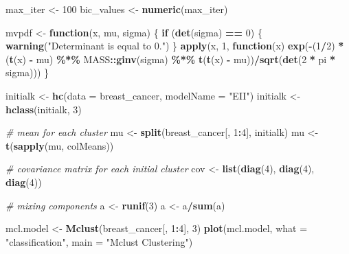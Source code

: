 \documentclass[12pt]{article}
\newenvironment{Shaded}{\begin{snugshade}}{\end{snugshade}}
\newcommand{\AttributeTok}[1]{\textcolor[rgb]{0.13,0.29,0.53}{#1}}
\newcommand{\CommentTok}[1]{\textcolor[rgb]{0.56,0.35,0.01}{\textit{#1}}}
\newcommand{\ControlFlowTok}[1]{\textcolor[rgb]{0.13,0.29,0.53}{\textbf{#1}}}
\newcommand{\DecValTok}[1]{\textcolor[rgb]{0.00,0.00,0.81}{#1}}
\newcommand{\FunctionTok}[1]{\textcolor[rgb]{0.13,0.29,0.53}{\textbf{#1}}}
\newcommand{\NormalTok}[1]{#1}
\newcommand{\OtherTok}[1]{\textcolor[rgb]{0.56,0.35,0.01}{#1}}
\newcommand{\SpecialCharTok}[1]{\textcolor[rgb]{0.81,0.36,0.00}{\textbf{#1}}}
\newcommand{\StringTok}[1]{\textcolor[rgb]{0.31,0.60,0.02}{#1}}
\begin{document}
\begin{Shaded}
\begin{Highlighting}[]
\NormalTok{max\_iter }\OtherTok{\textless{}{-}} \DecValTok{100}
\NormalTok{bic\_values }\OtherTok{\textless{}{-}} \FunctionTok{numeric}\NormalTok{(max\_iter)}

\NormalTok{mvpdf }\OtherTok{\textless{}{-}} \ControlFlowTok{function}\NormalTok{(x, mu, sigma) \{}
    \ControlFlowTok{if}\NormalTok{ (}\FunctionTok{det}\NormalTok{(sigma) }\SpecialCharTok{==} \DecValTok{0}\NormalTok{) \{}
        \FunctionTok{warning}\NormalTok{(}\StringTok{"Determinant is equal to 0."}\NormalTok{)}
\NormalTok{    \}}
    \FunctionTok{apply}\NormalTok{(x, }\DecValTok{1}\NormalTok{, }\ControlFlowTok{function}\NormalTok{(x) }\FunctionTok{exp}\NormalTok{(}\SpecialCharTok{{-}}\NormalTok{(}\DecValTok{1}\SpecialCharTok{/}\DecValTok{2}\NormalTok{) }\SpecialCharTok{*}\NormalTok{ (}\FunctionTok{t}\NormalTok{(x) }\SpecialCharTok{{-}}\NormalTok{ mu) }\SpecialCharTok{\%*\%}
\NormalTok{                                  MASS}\SpecialCharTok{::}\FunctionTok{ginv}\NormalTok{(sigma) }\SpecialCharTok{\%*\%}
                                  \FunctionTok{t}\NormalTok{(}\FunctionTok{t}\NormalTok{(x) }\SpecialCharTok{{-}}\NormalTok{ mu))}\SpecialCharTok{/}\FunctionTok{sqrt}\NormalTok{(}\FunctionTok{det}\NormalTok{(}\DecValTok{2} \SpecialCharTok{*}\NormalTok{ pi }\SpecialCharTok{*}\NormalTok{ sigma)))}
\NormalTok{\}}

\NormalTok{initialk }\OtherTok{\textless{}{-}} \FunctionTok{hc}\NormalTok{(}\AttributeTok{data =}\NormalTok{ breast\_cancer, }\AttributeTok{modelName =} \StringTok{"EII"}\NormalTok{)}
\NormalTok{initialk }\OtherTok{\textless{}{-}} \FunctionTok{hclass}\NormalTok{(initialk, }\DecValTok{3}\NormalTok{)}

\CommentTok{\# mean for each cluster}
\NormalTok{mu }\OtherTok{\textless{}{-}} \FunctionTok{split}\NormalTok{(breast\_cancer[, }\DecValTok{1}\SpecialCharTok{:}\DecValTok{4}\NormalTok{], initialk)}
\NormalTok{mu }\OtherTok{\textless{}{-}} \FunctionTok{t}\NormalTok{(}\FunctionTok{sapply}\NormalTok{(mu, colMeans))}

\CommentTok{\# covariance matrix for each initial cluster}
\NormalTok{cov }\OtherTok{\textless{}{-}} \FunctionTok{list}\NormalTok{(}\FunctionTok{diag}\NormalTok{(}\DecValTok{4}\NormalTok{), }\FunctionTok{diag}\NormalTok{(}\DecValTok{4}\NormalTok{), }\FunctionTok{diag}\NormalTok{(}\DecValTok{4}\NormalTok{))}

\CommentTok{\# mixing components}
\NormalTok{a }\OtherTok{\textless{}{-}} \FunctionTok{runif}\NormalTok{(}\DecValTok{3}\NormalTok{)}
\NormalTok{a }\OtherTok{\textless{}{-}}\NormalTok{ a}\SpecialCharTok{/}\FunctionTok{sum}\NormalTok{(a)}

\NormalTok{mcl.model }\OtherTok{\textless{}{-}} \FunctionTok{Mclust}\NormalTok{(breast\_cancer[, }\DecValTok{1}\SpecialCharTok{:}\DecValTok{4}\NormalTok{], }\DecValTok{3}\NormalTok{)}
\FunctionTok{plot}\NormalTok{(mcl.model, }\AttributeTok{what =} \StringTok{"classification"}\NormalTok{, }\AttributeTok{main =} \StringTok{"Mclust Clustering"}\NormalTok{)}
\end{Highlighting}
\end{Shaded}
\end{document}
